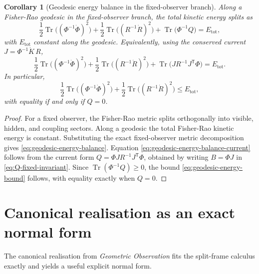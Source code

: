 \documentclass[11pt,a4paper]{article}
\numberwithin{equation}{section}
\DeclareMathOperator{\Tr}{Tr}
\theoremstyle{thmcompact}
\newtheorem{corollary}[theorem]{Corollary}
\theoremstyle{remark}
\begin{document}
\begin{corollary}[Geodesic energy balance in the fixed-observer branch]
\label{cor:geodesic-energy-balance}
Along a Fisher-Rao geodesic in the fixed-observer branch, the total kinetic energy splits as
\begin{equation}
\frac12\Tr\bigl((\Phi^{-1}\dot\Phi)^2\bigr)
+
\frac12\Tr\bigl((R^{-1}\dot R)^2\bigr)
+
\Tr\bigl(\Phi^{-1}Q\bigr)
=
E_{\mathrm{tot}},
\label{eq:geodesic-energy-balance}
\end{equation}
with $E_{\mathrm{tot}}$ constant along the geodesic. Equivalently, using the conserved current $J=\Phi^{-1}\dot K\,R$,
\begin{equation}
\frac12\Tr\bigl((\Phi^{-1}\dot\Phi)^2\bigr)
+
\frac12\Tr\bigl((R^{-1}\dot R)^2\bigr)
+
\Tr\bigl(JR^{-1}J^{\mathsf T}\Phi\bigr)
=
E_{\mathrm{tot}}.
\label{eq:geodesic-energy-balance-current}
\end{equation}
In particular,
\begin{equation}
\frac12\Tr\bigl((\Phi^{-1}\dot\Phi)^2\bigr)
+
\frac12\Tr\bigl((R^{-1}\dot R)^2\bigr)
\le E_{\mathrm{tot}},
\label{eq:geodesic-energy-bound}
\end{equation}
with equality if and only if $Q=0$.
\end{corollary}

\begin{proof}
For a fixed observer, the Fisher-Rao metric splits orthogonally into visible, hidden, and coupling sectors. Along a geodesic the total Fisher-Rao kinetic energy is constant. Substituting the exact fixed-observer metric decomposition gives \eqref{eq:geodesic-energy-balance}. Equation \eqref{eq:geodesic-energy-balance-current} follows from the current form $Q=\Phi J R^{-1}J^{\mathsf T}\Phi$, obtained by writing $B=\Phi J$ in \eqref{eq:Q-fixed-invariant}. Since $\Tr(\Phi^{-1}Q)\ge 0$, the bound \eqref{eq:geodesic-energy-bound} follows, with equality exactly when $Q=0$.
\end{proof}

\section{Canonical realisation as an exact normal form}
\label{sec:canonical-normal-form}

The canonical realisation from \emph{Geometric Observation} fits the split-frame calculus exactly and yields a useful explicit normal form.
\end{document}
